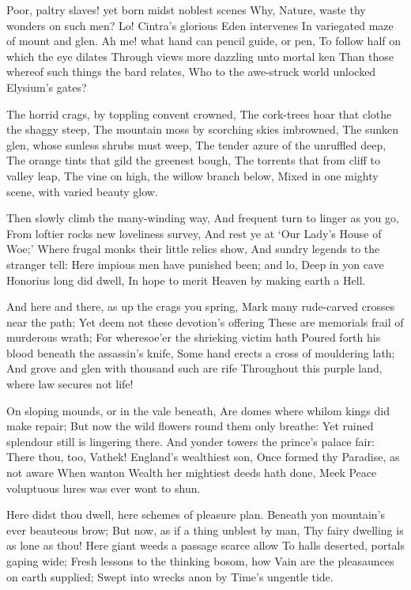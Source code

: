 \documentclass[10pt,twocolumn]{book}
\begin{document}
   Poor, paltry slaves! yet born midst noblest scenes\textemdash
   Why, Nature, waste thy wonders on such men?
   Lo! Cintra's glorious Eden intervenes
   In variegated maze of mount and glen.
   Ah me! what hand can pencil guide, or pen,
   To follow half on which the eye dilates
   Through views more dazzling unto mortal ken
   Than those whereof such things the bard relates,
Who to the awe-struck world unlocked Elysium's gates?


   The horrid crags, by toppling convent crowned,
   The cork-trees hoar that clothe the shaggy steep,
   The mountain moss by scorching skies imbrowned,
   The sunken glen, whose sunless shrubs must weep,
   The tender azure of the unruffled deep,
   The orange tints that gild the greenest bough,
   The torrents that from cliff to valley leap,
   The vine on high, the willow branch below,
Mixed in one mighty scene, with varied beauty glow.


   Then slowly climb the many-winding way,
   And frequent turn to linger as you go,
   From loftier rocks new loveliness survey,
   And rest ye at `Our Lady's House of Woe;'
   Where frugal monks their little relics show,
   And sundry legends to the stranger tell:
   Here impious men have punished been; and lo,
   Deep in yon cave Honorius long did dwell,
In hope to merit Heaven by making earth a Hell.

   And here and there, as up the crags you spring,
   Mark many rude-carved crosses near the path;
   Yet deem not these devotion's offering\textemdash
   These are memorials frail of murderous wrath;
   For wheresoe'er the shrieking victim hath
   Poured forth his blood beneath the assassin's knife,
   Some hand erects a cross of mouldering lath;
   And grove and glen with thousand such are rife
Throughout this purple land, where law secures not life!


   On sloping mounds, or in the vale beneath,
   Are domes where whilom kings did make repair;
   But now the wild flowers round them only breathe:
   Yet ruined splendour still is lingering there.
   And yonder towers the prince's palace fair:
   There thou, too, Vathek! England's wealthiest son,
   Once formed thy Paradise, as not aware
   When wanton Wealth her mightiest deeds hath done,
Meek Peace voluptuous lures was ever wont to shun.


   Here didst thou dwell, here schemes of pleasure plan.
   Beneath yon mountain's ever beauteous brow;
   But now, as if a thing unblest by man,
   Thy fairy dwelling is as lone as thou!
   Here giant weeds a passage scarce allow
   To halls deserted, portals gaping wide;
   Fresh lessons to the thinking bosom, how
   Vain are the pleasaunces on earth supplied;
Swept into wrecks anon by Time's ungentle tide.
\end{document}
